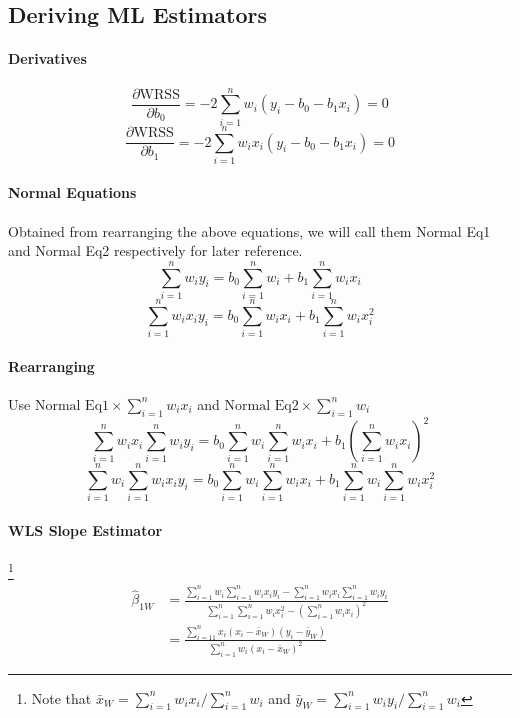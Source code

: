 \documentclass[11pt]{article}
\begin{document}
\subsection{Deriving ML Estimators}
\paragraph{Derivatives}
\begin{equation}
    \frac{\partial \mathrm{WRSS}}{\partial b_{0}}=-2 \sum_{i=1}^{n} w_{i}\left(y_{i}-b_{0}-b_{1} x_{i}\right)=0
\end{equation}
\begin{equation}
    \frac{\partial \mathrm{WRSS}}{\partial b_{1}}=-2 \sum_{i=1}^{n} w_{i} x_{i}\left(y_{i}-b_{0}-b_{1} x_{i}\right)=0
\end{equation}
\paragraph{Normal Equations} Obtained from rearranging the above equations, we will call them Normal Eq1 and Normal Eq2 respectively for later reference.
\begin{equation}
    \sum_{i=1}^{n} w_{i} y_{i}=b_{0} \sum_{i=1}^{n} w_{i}+b_{1} \sum_{i=1}^{n} w_{i} x_{i}
\end{equation}
\begin{equation}
    \sum_{i=1}^{n} w_{i} x_{i} y_{i}=b_{0} \sum_{i=1}^{n} w_{i} x_{i}+b_{1} \sum_{i=1}^{n} w_{i} x_{i}^{2}
\end{equation}
\paragraph{Rearranging} Use $\text{Normal Eq1} \times\sum_{i=1}^{n} w_{i} x_{i}$ and $\text{Normal Eq2}\times\sum_{i=1}^{n} w_{i}$
\begin{equation}
    \sum_{i=1}^{n} w_{i} x_{i} \sum_{i=1}^{n} w_{i} y_{i}=b_{0} \sum_{i=1}^{n} w_{i} \sum_{i=1}^{n} w_{i} x_{i}+b_{1}\left(\sum_{i=1}^{n} w_{i} x_{i}\right)^{2}
\end{equation}
\begin{equation}
    \sum_{i=1}^{n} w_{i} \sum_{i=1}^{n} w_{i} x_{i} y_{i}=b_{0} \sum_{i=1}^{n} w_{i} \sum_{i=1}^{n} w_{i} x_{i}+b_{1} \sum_{i=1}^{n} w_{i} \sum_{i=1}^{n} w_{i} x_{i}^{2}
\end{equation}
\paragraph{WLS Slope Estimator} \footnote{Note that $\bar{x}_{W}=\sum_{i=1}^{n} w_{i} x_{i} / \sum_{i=1}^{n} w_{i}$ and $\bar{y}_{W}=\sum_{i=1}^{n} w_{i} y_{i} / \sum_{i=1}^{n} w_{i}$}
\begin{align}
    \hat{\beta}_{1W} &= \frac{\sum_{i=1}^{n} w_{i} \sum_{i=1}^{n} w_{i} x_{i} y_{i}-\sum_{i=1}^{n} w_{i} x_{i} \sum_{i=1}^{n} w_{i} y_{i}}{\sum_{i=1}^{n} \sum_{i=1}^{n} w_{i} x_{i}^{2}-\left(\sum_{i=1}^{n} w_{i} x_{i}\right)^{2}} \\
    &= \frac{\sum_{i=11}^{n} x_{i}\left(x_{i}-\bar{x}_{W}\right)\left(y_{i}-\bar{y}_{W}\right)}{\sum_{i=1}^{n} w_{i}\left(x_{i}-\bar{x}_{W}\right)^{2}}
\end{align}
\end{document}
